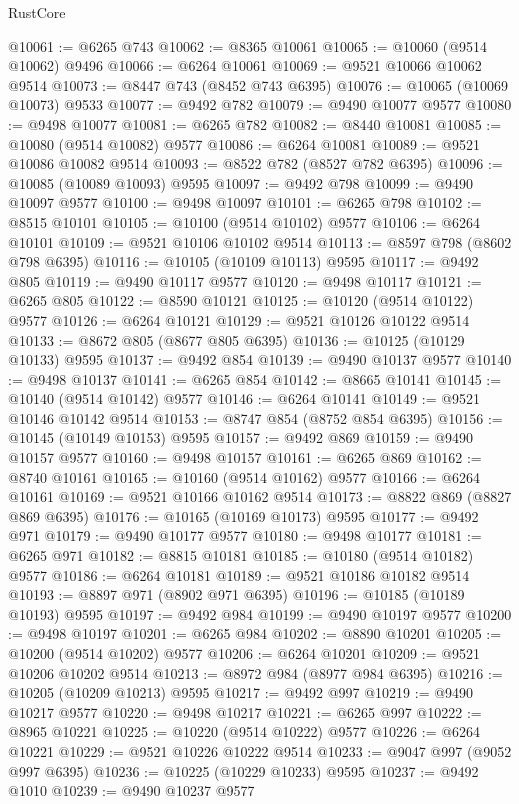 \begin{lexlean}{RustCore}
\begin{coremodule}
@10061 := @6265 @743
@10062 := @8365 @10061
@10065 := @10060 (@9514 @10062) @9496
@10066 := @6264 @10061
@10069 := @9521 @10066 @10062 @9514
@10073 := @8447 @743 (@8452 @743 @6395)
@10076 := @10065 (@10069 @10073) @9533
@10077 := @9492 @782
@10079 := @9490 @10077 @9577
@10080 := @9498 @10077
@10081 := @6265 @782
@10082 := @8440 @10081
@10085 := @10080 (@9514 @10082) @9577
@10086 := @6264 @10081
@10089 := @9521 @10086 @10082 @9514
@10093 := @8522 @782 (@8527 @782 @6395)
@10096 := @10085 (@10089 @10093) @9595
@10097 := @9492 @798
@10099 := @9490 @10097 @9577
@10100 := @9498 @10097
@10101 := @6265 @798
@10102 := @8515 @10101
@10105 := @10100 (@9514 @10102) @9577
@10106 := @6264 @10101
@10109 := @9521 @10106 @10102 @9514
@10113 := @8597 @798 (@8602 @798 @6395)
@10116 := @10105 (@10109 @10113) @9595
@10117 := @9492 @805
@10119 := @9490 @10117 @9577
@10120 := @9498 @10117
@10121 := @6265 @805
@10122 := @8590 @10121
@10125 := @10120 (@9514 @10122) @9577
@10126 := @6264 @10121
@10129 := @9521 @10126 @10122 @9514
@10133 := @8672 @805 (@8677 @805 @6395)
@10136 := @10125 (@10129 @10133) @9595
@10137 := @9492 @854
@10139 := @9490 @10137 @9577
@10140 := @9498 @10137
@10141 := @6265 @854
@10142 := @8665 @10141
@10145 := @10140 (@9514 @10142) @9577
@10146 := @6264 @10141
@10149 := @9521 @10146 @10142 @9514
@10153 := @8747 @854 (@8752 @854 @6395)
@10156 := @10145 (@10149 @10153) @9595
@10157 := @9492 @869
@10159 := @9490 @10157 @9577
@10160 := @9498 @10157
@10161 := @6265 @869
@10162 := @8740 @10161
@10165 := @10160 (@9514 @10162) @9577
@10166 := @6264 @10161
@10169 := @9521 @10166 @10162 @9514
@10173 := @8822 @869 (@8827 @869 @6395)
@10176 := @10165 (@10169 @10173) @9595
@10177 := @9492 @971
@10179 := @9490 @10177 @9577
@10180 := @9498 @10177
@10181 := @6265 @971
@10182 := @8815 @10181
@10185 := @10180 (@9514 @10182) @9577
@10186 := @6264 @10181
@10189 := @9521 @10186 @10182 @9514
@10193 := @8897 @971 (@8902 @971 @6395)
@10196 := @10185 (@10189 @10193) @9595
@10197 := @9492 @984
@10199 := @9490 @10197 @9577
@10200 := @9498 @10197
@10201 := @6265 @984
@10202 := @8890 @10201
@10205 := @10200 (@9514 @10202) @9577
@10206 := @6264 @10201
@10209 := @9521 @10206 @10202 @9514
@10213 := @8972 @984 (@8977 @984 @6395)
@10216 := @10205 (@10209 @10213) @9595
@10217 := @9492 @997
@10219 := @9490 @10217 @9577
@10220 := @9498 @10217
@10221 := @6265 @997
@10222 := @8965 @10221
@10225 := @10220 (@9514 @10222) @9577
@10226 := @6264 @10221
@10229 := @9521 @10226 @10222 @9514
@10233 := @9047 @997 (@9052 @997 @6395)
@10236 := @10225 (@10229 @10233) @9595
@10237 := @9492 @1010
@10239 := @9490 @10237 @9577

\end{coremodule}
\end{lexlean}
